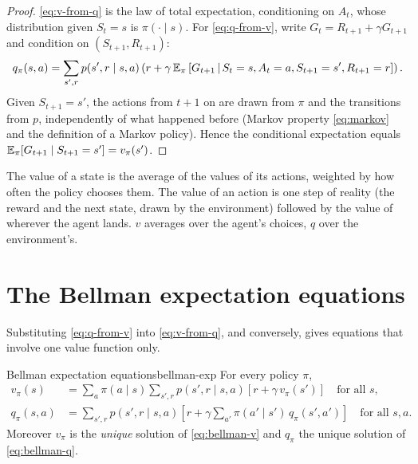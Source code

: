 \begin{proof}
  \eqref{eq:v-from-q} is the law of total expectation, conditioning on
  $A_t$, whose distribution given $S_t = s$ is $\pi(\cdot \mid s)$. For
  \eqref{eq:q-from-v}, write $G_t = R_{t+1} + \gamma G_{t+1}$ and condition
  on $(S_{t+1}, R_{t+1})$:
  \begin{equation*}
    q_\pi(s, a) = \sum_{s', r} p(s', r \mid s, a) \left( r + \gamma\,
      \mathbb{E}_\pi\left[G_{t+1} \,\middle|\, S_t = s, A_t = a, S_{t+1} = s',
        R_{t+1} = r\right] \right).
  \end{equation*}
  Given $S_{t+1} = s'$, the actions from $t+1$ on are drawn from $\pi$ and
  the transitions from $p$, independently of what happened before
  (Markov property \eqref{eq:markov} and the definition of a Markov
  policy). Hence the conditional expectation equals
  $\mathbb{E}_\pi[G_{t+1} \mid S_{t+1} = s'] = v_\pi(s')$.
\end{proof}

\begin{intuition}
  The value of a state is the average of the values of its actions,
  weighted by how often the policy chooses them. The value of an action is
  one step of reality (the reward and the next state, drawn by the
  environment) followed by the value of wherever the agent lands. $v$
  averages over the agent's choices, $q$ over the environment's.
\end{intuition}

\section{The Bellman expectation equations}

Substituting \eqref{eq:q-from-v} into \eqref{eq:v-from-q}, and conversely,
gives equations that involve one value function only.

\begin{theorem}{Bellman expectation equations}{bellman-exp}
  For every policy $\pi$,
  \begin{align}
    \label{eq:bellman-v}
    v_\pi(s) &= \sum_a \pi(a \mid s) \sum_{s', r} p(s', r \mid s, a)
      \left[ r + \gamma\, v_\pi(s') \right]
      \quad \text{for all } s, \\
    \label{eq:bellman-q}
    q_\pi(s, a) &= \sum_{s', r} p(s', r \mid s, a)
      \left[ r + \gamma \sum_{a'} \pi(a' \mid s')\, q_\pi(s', a') \right]
      \quad \text{for all } s, a.
  \end{align}
  Moreover $v_\pi$ is the \emph{unique} solution of \eqref{eq:bellman-v}
  and $q_\pi$ the unique solution of \eqref{eq:bellman-q}.
\end{theorem}

